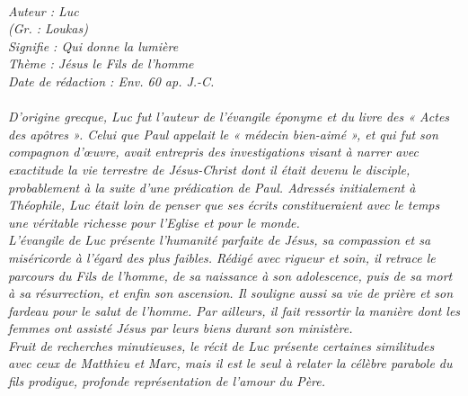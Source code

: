 \BFont
\noindent\hrulefill
{\footnotesize
\textit{
\bigskip
{\centering{}
\\Auteur : Luc
\\(Gr. : Loukas)
\\Signifie : Qui donne la lumière
\\Thème : Jésus le Fils de l'homme
\\Date de rédaction : Env. 60 ap. J.-C.\\}
}
\textit{
\\D'origine grecque, Luc fut l'auteur de l'évangile éponyme et du livre des « Actes des apôtres ». Celui que Paul appelait le « médecin bien-aimé », et qui fut son compagnon d'œuvre, avait entrepris des investigations visant à narrer avec exactitude la vie terrestre de Jésus-Christ dont il était devenu le disciple, probablement à la suite d'une prédication de Paul. Adressés initialement à Théophile, Luc était loin de penser que ses écrits constitueraient avec le temps une véritable richesse pour l'Eglise et pour le monde.
\\L'évangile de Luc présente l'humanité parfaite de Jésus, sa compassion et sa miséricorde à l'égard des plus faibles. Rédigé avec rigueur et soin, il retrace le parcours du Fils de l'homme, de sa naissance à son adolescence, puis de sa mort à sa résurrection, et enfin son ascension. Il souligne aussi sa vie de prière et son fardeau pour le salut de l'homme. Par ailleurs, il fait ressortir la manière dont les femmes ont assisté Jésus par leurs biens durant son ministère.
\\Fruit de recherches minutieuses, le récit de Luc présente certaines similitudes avec ceux de Matthieu et Marc, mais il est le seul à relater la célèbre parabole du fils prodigue, profonde représentation de l'amour du Père.\bigskip
}
}
\par\nobreak\noindent\hrulefill

